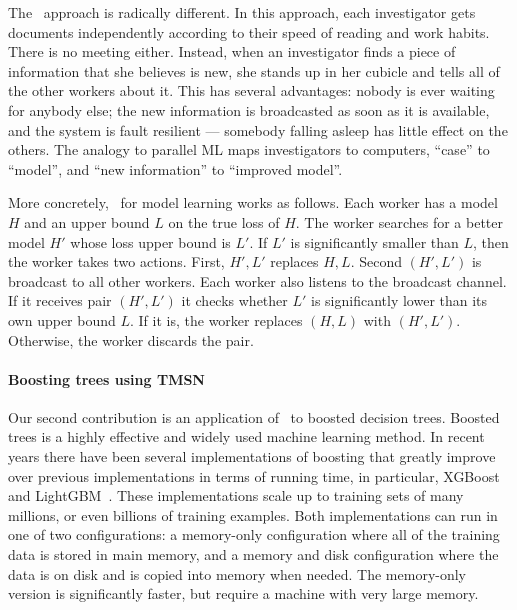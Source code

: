The \tmsn\ approach is radically different. In this approach, each
investigator gets documents independently according to their speed of
reading and work habits. There is no meeting either. Instead, when
an investigator finds a piece of information that she believes is new,
she stands up in her cubicle and tells all of the other workers about
it. This has several advantages: nobody is ever waiting for anybody
else; the new information is broadcasted as soon as it is available, and
the system is fault resilient --- somebody falling asleep has little
effect on the others.
The analogy to parallel ML maps investigators
to computers, ``case'' to ``model'', and ``new information'' to
``improved model''.

\iffalse
Consider a team of investigators that is going through
thousands of documents to build a criminal case. Assume also that most
of the documents contain no new information. It makes little sense for
them to send each other a summary of each document they read, they
would just be wasting each other's time that way. What would make more
sense is for each to sit reading in their cubicle until one of them
identifies a document with new information, that person than stands
up, interrupts all of the other people, and gives each of them a
summary of what they found. This ensures that all of the investigators
are updated as soon as new information is available, but are otherwise
left to do their work.
\fi

More concretely, \tmsn\ for model learning works as follows. Each
worker has a model $H$ and an upper bound $L$ on the true loss of
$H$. The worker searches for a better model $H'$ whose loss upper
bound is $L'$. If $L'$ is significantly smaller than $L$, then the
worker takes two actions. First, $H',L'$ replaces $H,L$. Second
$(H',L')$ is broadcast to all other workers.  Each worker also listens
to the broadcast channel. If it receives pair $(H',L')$ it checks
whether $L'$ is significantly lower than its own upper bound $L$. If
it is, the worker replaces $(H,L)$ with $(H',L')$. Otherwise, the worker discards the
pair.

\paragraph{Boosting trees using TMSN}
Our second contribution is an application of \tmsn\ to boosted
decision trees. Boosted trees is a highly effective and widely used
machine learning method. In recent years there have been several
implementations of boosting that greatly improve over previous
implementations in terms of running time, in particular,
XGBoost~\cite{chen_xgboost:_2016} and
LightGBM~\cite{ke_lightgbm:_2017}. These implementations scale up to
training sets of many millions, or even billions of training examples.
Both implementations can run in one of two configurations: a
memory-only configuration where all of the training data is stored in
main memory, and a memory and disk configuration where the data is on
disk and is copied into memory when needed. The memory-only version is
significantly faster, but require a machine with very large
memory.

